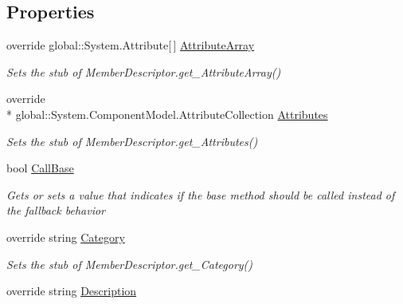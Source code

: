 \subsection*{Properties}
\begin{DoxyCompactItemize}
\item 
override global\-::\-System.\-Attribute\mbox{[}$\,$\mbox{]} \hyperlink{class_system_1_1_component_model_1_1_fakes_1_1_stub_member_descriptor_a67a8fb481380e0b1136cdb2bc61874b2}{Attribute\-Array}
\begin{DoxyCompactList}\small\item\em Sets the stub of Member\-Descriptor.\-get\-\_\-\-Attribute\-Array()\end{DoxyCompactList}\item 
override \\*
global\-::\-System.\-Component\-Model.\-Attribute\-Collection \hyperlink{class_system_1_1_component_model_1_1_fakes_1_1_stub_member_descriptor_a85087da9687b9aed638c57575aea2352}{Attributes}
\begin{DoxyCompactList}\small\item\em Sets the stub of Member\-Descriptor.\-get\-\_\-\-Attributes()\end{DoxyCompactList}\item 
bool \hyperlink{class_system_1_1_component_model_1_1_fakes_1_1_stub_member_descriptor_acd1a01e262b18af16b5a6ea4a8eeaa3d}{Call\-Base}
\begin{DoxyCompactList}\small\item\em Gets or sets a value that indicates if the base method should be called instead of the fallback behavior\end{DoxyCompactList}\item 
override string \hyperlink{class_system_1_1_component_model_1_1_fakes_1_1_stub_member_descriptor_aa656937185623d957b6e6be6cf4abdee}{Category}
\begin{DoxyCompactList}\small\item\em Sets the stub of Member\-Descriptor.\-get\-\_\-\-Category()\end{DoxyCompactList}\item 
override string \hyperlink{class_system_1_1_component_model_1_1_fakes_1_1_stub_member_descriptor_a1f423b4b6caa499543c99a31bd9986f9}{Description}

\end{DoxyCompactItemize}
